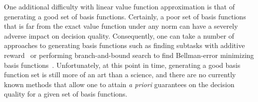 One additional difficulty with linear value function approximation
is that of generating a good set of basis functions.  Certainly, a
poor set of basis functions that is far from the exact value function
under any norm can have a severely adverse impact on decision quality.
Consequently, one can take a number of approaches to generating basis
functions such as finding subtasks with additive reward~\cite{basis1}
or performing branch-and-bound search to find Bellman-error minimizing
basis functions~\cite{basis2}.  Unfortunately, at this point in time,
generating a good basis function set is still more of an art than a
science, and there are no currently known methods that allow one to attain
\emph{a priori} guarantees on the decision quality for a given set of
basis functions.






